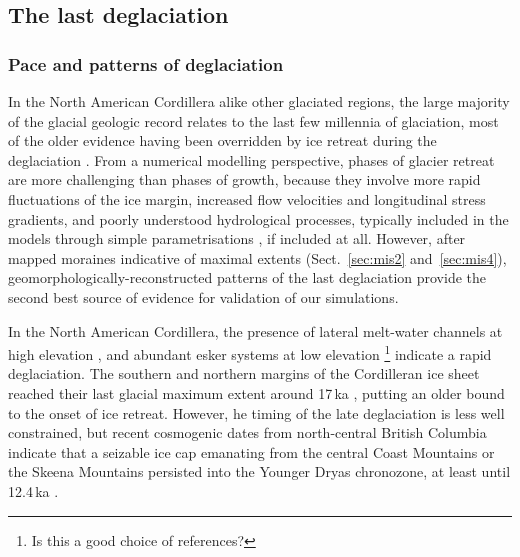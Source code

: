 \documentclass[tc, manuscript]{copernicus}
\begin{document}
\subsection{The last deglaciation}

\subsubsection{Pace and patterns of deglaciation}

In the North American Cordillera alike other glaciated regions, the large
majority of the glacial geologic record relates to the last few millennia of
glaciation, most of the older evidence having been overridden by ice retreat
during the deglaciation \citep{Kleman.1994, Kleman.etal.2010}. From a
numerical modelling perspective, phases of glacier retreat are more challenging
than phases of growth, because they involve more rapid fluctuations of the ice
margin, increased flow velocities and longitudinal stress gradients, and poorly
understood hydrological processes, typically included in the models through
simple parametrisations \citep[e.g.][]{Clason.etal.2012, Clason.etal.2014,
Bueler.Pelt.2014}, if included at all. However, after mapped moraines
indicative of maximal extents (Sect.~\ref{sec:mis2} and~\ref{sec:mis4}),
geomorphologically-reconstructed patterns of the last deglaciation provide the
second best source of evidence for validation of our simulations.

In the North American Cordillera, the presence of lateral melt-water channels
at high elevation \citep{Margold.etal.2011, Margold.etal.2013a,
Margold.etal.2014}, and abundant esker systems at low elevation
\citep{Burke.etal.2012, Burke.etal.2012a, Perkins.etal.2013,
Margold.etal.2013}\footnote{
    Is this a good choice of references?}
indicate a rapid deglaciation. The southern and northern margins of the
Cordilleran ice sheet reached their last glacial maximum extent around
17\,ka \citep[Sect.~\ref{sec:timing};][]{Porter.Swanson.1998, Cosma.etal.2008,
Stroeven.etal.2010, Stroeven.etal.2014}, putting an older bound to the
onset of ice retreat. However, he timing of the late deglaciation is less well
constrained, but recent cosmogenic dates from north-central British Columbia
indicate that a seizable ice cap emanating from the central Coast Mountains or
the Skeena Mountains persisted into the Younger Dryas chronozone, at least
until 12.4\,ka \citep{Margold.etal.2014}.
\end{document}
